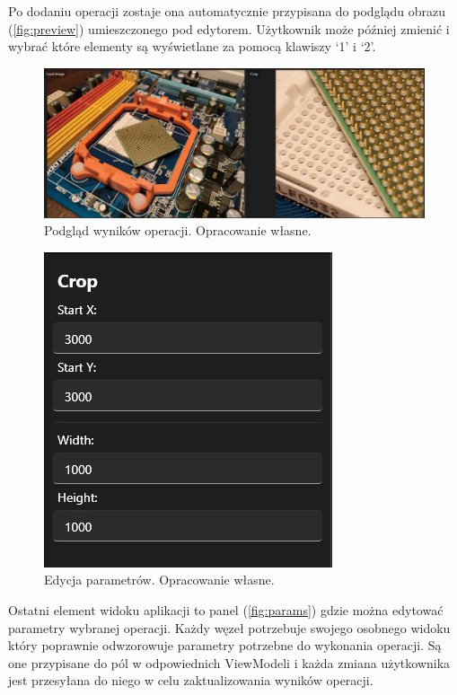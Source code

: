 Po dodaniu operacji zostaje ona automatycznie przypisana do podglądu obrazu (\autoref{fig:preview}) umieszczonego pod edytorem. Użytkownik może później zmienić i wybrać które elementy są wyświetlane za pomocą klawiszy `1' i `2'.

\begin{figure}[H]
    \centering
    \includegraphics[width=1\linewidth]{images/Picture16.jpg}
    \caption{Podgląd wyników operacji. Opracowanie własne.}
    \label{fig:preview}
\end{figure}

\begin{figure}[H]
    \centering
    \includegraphics[width=0.6\linewidth]{images/Picture17.jpg}
    \caption{Edycja parametrów. Opracowanie własne.}
    \label{fig:params}
\end{figure}

Ostatni element widoku aplikacji to panel (\autoref{fig:params}) gdzie można edytować parametry wybranej operacji. 
Każdy węzeł potrzebuje swojego osobnego widoku który poprawnie odwzorowuje parametry potrzebne do wykonania operacji. 
Są one przypisane do pól w odpowiednich ViewModeli i każda zmiana użytkownika jest przesyłana do niego w celu zaktualizowania wyników operacji.

